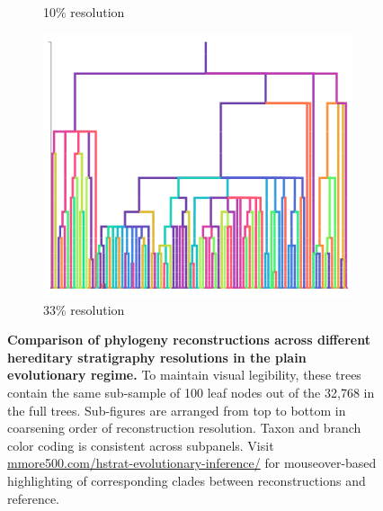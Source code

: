 \begin{figure}
\begin{subfigure}[b]{\linewidth}
    \caption{%
      10\% resolution}
    \label{fig:plain-perfect-and-reconstruction-phylogenies:resolution_10}
  \end{subfigure}
  \begin{subfigure}[b]{\linewidth}
    \centering
    \includegraphics[width=\textwidth, height=0.13\textheight]{img/plain_resolution_3} \caption{%
      33\% resolution}
    \label{fig:plain-perfect-and-reconstruction-phylogenies:resolution_3}
  \end{subfigure}
  \caption{%
  \textbf{Comparison of phylogeny reconstructions across different hereditary stratigraphy resolutions in the plain evolutionary regime.}
    To maintain visual legibility, these trees contain the same sub-sample of 100 leaf nodes out of the 32,768 in the full trees.
    Sub-figures are arranged from top to bottom in coarsening order of reconstruction resolution.
    Taxon and branch color coding is consistent across subpanels.
    Visit \url{mmore500.com/hstrat-evolutionary-inference/} for mouseover-based highlighting of corresponding clades between reconstructions and reference.
  }
  \label{fig:plain-perfect-and-reconstruction-phylogenies}
\end{figure}
